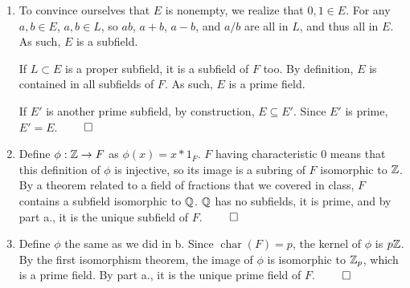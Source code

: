 \documentclass[12pt]{report}
\begin{document}
\sol
\begin{enumerate}[label=\alph*.]
    \item To convince ourselves that $E$ is nonempty, we realize that $0,1 \in E$. For any $a,b \in E$, $a,b \in L$, so $ab$, $a+b$, $a-b$, and $a/b$ are all in $L$, and thus all in $E$. As such, $E$ is a subfield. 
    
    If $L \subset E$ is a proper subfield, it is a subfield of $F$ too. By definition, $E$ is contained in all subfields of $F$. As such, $E$ is a prime field.
    
    If $E'$ is another prime subfield, by construction, $E \subseteq E'$. Since $E'$ is prime, $E' = E$. $\qed$
    \item Define $\phi : \ZZ \to F$ as $\phi(x) = x * 1_F$. $F$ having characteristic 0 means that this definition of $\phi$ is injective, so its image is a subring of $F$ isomorphic to $\ZZ$. By a theorem related to a field of fractions that we covered in class, $F$ contains a subfield isomorphic to $\QQ$. $\QQ$ has no subfields, it is prime, and by part a., it is the unique subfield of $F$. $\qed$
    \item Define $\phi$ the same as we did in b. Since $\operatorname{char}(F) = p$, the kernel of $\phi$ is $p\ZZ$. By the first isomorphism theorem, the image of $\phi$ is isomorphic to $\ZZ_p$, which is a prime field. By part a., it is the unique prime field of $F$. $\qed$
\end{enumerate}
\end{document}
